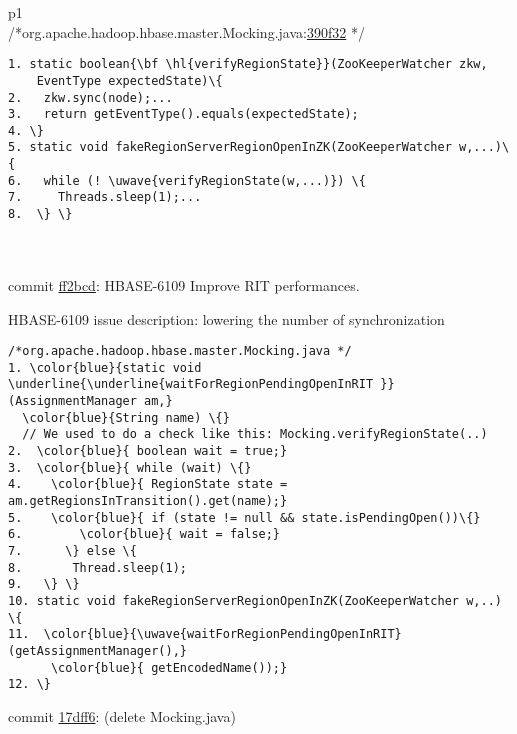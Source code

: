 \begin{figure*}[!htb]
 \begin{minipage}{0.47\textwidth}
 \scriptsize 
 \begin{tabular}{p{}}
  \hline 
   \\ \hline
  /*org.apache.hadoop.hbase.master.Mocking.java:\href{https://github.com/apache/hbase/blob/390f32d79fd0c0464fcab008150ad182f4c0abef/hbase-server/src/test/java/org/apache/hadoop/hbase/master/Mocking.java}{390f32} */
 \begin{Verbatim}[commandchars=\\\{\}, tabsize=2]
1. static boolean{\bf \hl{verifyRegionState}}(ZooKeeperWatcher zkw, 
    EventType expectedState)\{
2.   zkw.sync(node);...
3.   return getEventType().equals(expectedState);
4. \}  
5. static void fakeRegionServerRegionOpenInZK(ZooKeeperWatcher w,...)\{
6.   while (! \uwave{verifyRegionState(w,...)}) \{
7.     Threads.sleep(1);...
8.  \} \}
 \end{Verbatim}
 \vspace*{-4mm}
 \\  \hline
  \\ \hline
 \vspace*{-1mm}
commit \href{https://github.com/apache/hbase/commit/ff2bcd#diff-53def65a3cf679a3f048ab71bcea9293}{ff2bcd}: HBASE-6109 Improve RIT performances.

HBASE-6109 issue description: lowering the number of synchronization
 \vspace*{-2mm}
 \begin{Verbatim}[commandchars=\\\{\}, tabsize=2]
 /*org.apache.hadoop.hbase.master.Mocking.java */
1. \color{blue}{static void \underline{\underline{waitForRegionPendingOpenInRIT }}(AssignmentManager am,}
  \color{blue}{String name) \{}
  // We used to do a check like this: Mocking.verifyRegionState(..)
2.  \color{blue}{ boolean wait = true;}
3.  \color{blue}{ while (wait) \{}
4.    \color{blue}{ RegionState state = am.getRegionsInTransition().get(name);}
5.    \color{blue}{ if (state != null && state.isPendingOpen())\{}
6.        \color{blue}{ wait = false;}
7.      \} else \{
8.       Thread.sleep(1);
9.   \} \}
10. static void fakeRegionServerRegionOpenInZK(ZooKeeperWatcher w,..) \{
11.  \color{blue}{\uwave{waitForRegionPendingOpenInRIT}(getAssignmentManager(),}
      \color{blue}{ getEncodedName());}
12. \}
 \end{Verbatim} 
 commit \href{https://github.com/apache/hbase/commit/17dff6#diff-53def65a3cf679a3f048ab71bcea9293}{17dff6}: (delete Mocking.java)


\end{tabular}
\end{minipage}
\end{figure*}
